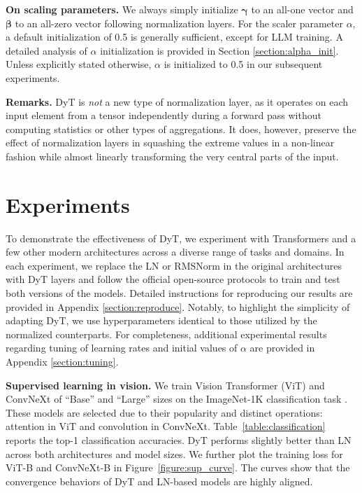 \documentclass[]{fairmeta}
\renewcommand{\paragraph}[1]{\vspace{1.25mm}\noindent\textbf{#1}}
\begin{document}
\vskip 0.2cm
\paragraph{On scaling parameters.} We always simply initialize $\bm{\gamma}$ to an all-one vector and $\bm{\beta}$ to an all-zero vector following normalization layers. For the scaler parameter $\alpha$, a default initialization of 0.5 is generally sufficient, except for LLM training.
A detailed analysis of $\alpha$ initialization is provided in Section \ref{section:alpha_init}.
Unless explicitly stated otherwise, $\alpha$ is initialized to 0.5 in our subsequent experiments.

\vskip 0.2cm
\paragraph{Remarks.} DyT is \emph{not} a new type of normalization layer, as it operates on each input element from a tensor independently during a forward pass without computing statistics or other types of aggregations. It does, however, preserve the effect of normalization layers in squashing the extreme values in a non-linear fashion while almost linearly transforming the very central parts of the input.




\section{Experiments}
\label{section:experiments}

\vskip 0.2cm
To demonstrate the effectiveness of DyT, we experiment with Transformers and a few other modern architectures across a diverse range of tasks and domains.
In each experiment, we replace the LN or RMSNorm in the original architectures with DyT layers and follow the official open-source protocols to train and test both versions of the models. Detailed instructions for reproducing our results are provided in Appendix \ref{section:reproduce}.
Notably, to highlight the simplicity of adapting DyT, we use hyperparameters identical to those utilized by the normalized counterparts.
For completeness, additional experimental results regarding tuning of learning rates and initial values of $\alpha$ are provided in Appendix \ref{section:tuning}.


\vskip 0.2cm
\paragraph{Supervised learning in vision.}
We train Vision Transformer (ViT) \citep{dosovitskiy2020image} and ConvNeXt \citep{liu2022convnet} of ``Base'' and ``Large'' sizes on the ImageNet-1K classification task \citep{deng2009imagenet}.
These models are selected due to their popularity and distinct operations: attention in ViT and convolution in ConvNeXt.
Table~\ref{table:classification} reports the top-1 classification accuracies.
DyT performs slightly better than LN across both architectures and model sizes.
We further plot the training loss for ViT-B and ConvNeXt-B in Figure~\ref{figure:sup_curve}. The curves show that the convergence behaviors of DyT and LN-based models are highly aligned.
\end{document}
